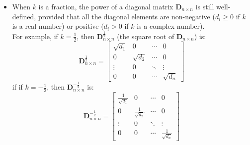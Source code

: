 \documentclass[oneside]{book}
\begin{document}
{{\begin{itemize}
\[\begin{bmatrix}
                        0          & d_{2}^{-k} & \cdots & 0\\
                        \vdots     & 0          & \ddots & \vdots\\
                        0          & 0          & \cdots & d_{n}^{-k}
                    \end{bmatrix}
                    =
                    \begin{bmatrix}
                        \frac{1}{d_{1}^{k}} & 0                   & \cdots & 0\\
                        0                   & \frac{1}{d_{2}^{k}} & \cdots & 0\\
                        \vdots              & 0                   & \ddots & \vdots\\
                        0                   & 0                   & \cdots & \frac{1}{d_{n}^{k}}
                    \end{bmatrix}
            \]
            \item When $k$ is a fraction, the power of a diagonal matrix $\mathbf{D}_{n \times n}$ is still well-defined, provided that all the diagonal elements are non-negative ($d_{i}\geq0$ if $k$ is a real number) or positive ($d_{i}>0$ if $k$ is a complex number).\\
            For example, if $k=\frac{1}{2}$, then $\mathbf{D}_{n \times n}^{\frac{1}{2}}$ (the square root of
            $\mathbf{D}_{n \times n}$) is:
            \[
                \mathbf{D}_{n \times n}^{\frac{1}{2}}=
                \begin{bmatrix}
                    \sqrt{d_{1}} & 0            & \cdots & 0\\
                    0            & \sqrt{d_{2}} & \cdots & 0\\
                    \vdots       & 0            & \ddots & \vdots\\
                    0            & 0            & \cdots & \sqrt{d_{n}}
                \end{bmatrix}
            \]
            if if $k=-\frac{1}{2}$, then $\mathbf{D}_{n \times n}^{-\frac{1}{2}}$ is:
            \[
                \mathbf{D}_{n \times n}^{-\frac{1}{2}}=
                \begin{bmatrix}
                    \frac{1}{\sqrt{d_{1}}} & 0                      & \cdots & 0\\
                    0                      & \frac{1}{\sqrt{d_{2}}} & \cdots & 0\\
                    \vdots                 & 0                      & \ddots & \vdots\\
                    0                      & 0                      & \cdots & \frac{1}{\sqrt{d_{n}}}
                \end{bmatrix}
            \]
        \end{itemize}
    }
}
\end{document}
